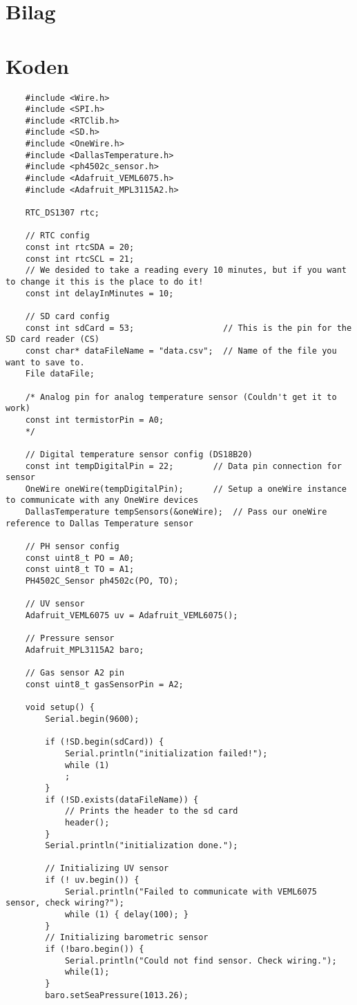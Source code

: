 \section{Bilag}
\section{Koden}
\begin{lstlisting}
	#include <Wire.h>
	#include <SPI.h>
	#include <RTClib.h>
	#include <SD.h>
	#include <OneWire.h>
	#include <DallasTemperature.h>
	#include <ph4502c_sensor.h>
	#include <Adafruit_VEML6075.h>
	#include <Adafruit_MPL3115A2.h>
	
	RTC_DS1307 rtc;
	
	// RTC config
	const int rtcSDA = 20;
	const int rtcSCL = 21;
	// We desided to take a reading every 10 minutes, but if you want to change it this is the place to do it!
	const int delayInMinutes = 10;
	
	// SD card config
	const int sdCard = 53;                  // This is the pin for the SD card reader (CS)
	const char* dataFileName = "data.csv";  // Name of the file you want to save to.
	File dataFile;
	
	/* Analog pin for analog temperature sensor (Couldn't get it to work)
	const int termistorPin = A0;
	*/
	
	// Digital temperature sensor config (DS18B20)
	const int tempDigitalPin = 22;        // Data pin connection for sensor
	OneWire oneWire(tempDigitalPin);      // Setup a oneWire instance to communicate with any OneWire devices
	DallasTemperature tempSensors(&oneWire);  // Pass our oneWire reference to Dallas Temperature sensor
	
	// PH sensor config
	const uint8_t PO = A0;
	const uint8_t TO = A1;
	PH4502C_Sensor ph4502c(PO, TO);
	
	// UV sensor
	Adafruit_VEML6075 uv = Adafruit_VEML6075();
	
	// Pressure sensor
	Adafruit_MPL3115A2 baro;
	
	// Gas sensor A2 pin
	const uint8_t gasSensorPin = A2;
	
	void setup() {
		Serial.begin(9600);
		
		if (!SD.begin(sdCard)) {
			Serial.println("initialization failed!");
			while (1)
			;
		}
		if (!SD.exists(dataFileName)) {
			// Prints the header to the sd card
			header();
		}
		Serial.println("initialization done.");
		
		// Initializing UV sensor
		if (! uv.begin()) {
			Serial.println("Failed to communicate with VEML6075 sensor, check wiring?");
			while (1) { delay(100); }
		}
		// Initializing barometric sensor
		if (!baro.begin()) {
			Serial.println("Could not find sensor. Check wiring.");
			while(1);
		}
		baro.setSeaPressure(1013.26);
		

\end{lstlisting}
